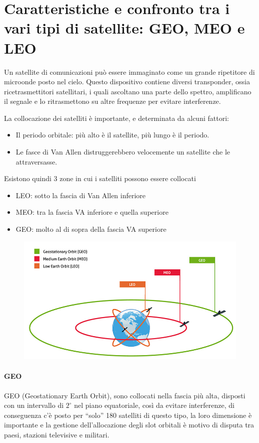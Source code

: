 \section{Caratteristiche e confronto tra i vari tipi di satellite: GEO, MEO e LEO}

Un satellite di comunicazioni può essere immaginato come un grande ripetitore di microonde posto nel cielo. Questo dispositivo contiene diversi transponder, ossia ricetrasmettitori satellitari, i quali ascoltano una parte dello spettro, amplificano il segnale e lo ritrasmettono su altre frequenze per evitare interferenze.

La collocazione dei satelliti è importante, e determinata da alcuni fattori:
\begin{itemize}
\item	Il periodo orbitale: più alto è il satellite, più lungo è il periodo.
\item	Le fasce di Van Allen distruggerebbero velocemente un satellite che le attraversasse.
\end{itemize}
Esistono quindi 3 zone in cui i satelliti possono essere collocati
\begin{itemize}
\item LEO: sotto la fascia di Van Allen inferiore
\item MEO: tra la fascia VA inferiore e quella superiore
\item GEO: molto al di sopra della fascia VA superiore
\end{itemize}

\begin{figure}[H]
\centering
\includegraphics[scale=0.55]{res/img/4_satelliti.png}
\end{figure}
 
\paragraph{GEO}
GEO (Geostationary Earth Orbit), sono collocati nella fascia più alta, disposti con un intervallo di $2^{\circ}$ nel piano equatoriale, così da evitare interferenze, di conseguenza c’è posto per “solo” 180 satelliti di questo tipo, la loro dimensione è importante e la gestione dell’allocazione degli slot orbitali è motivo di disputa tra paesi, stazioni televisive e militari.
